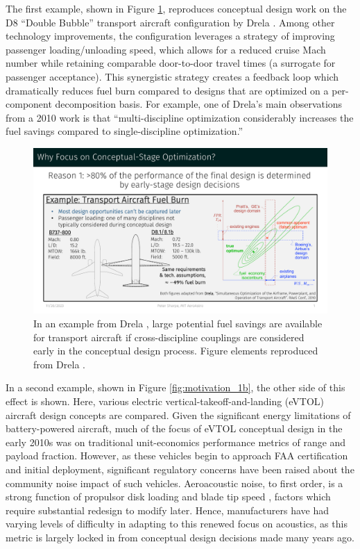 The first example, shown in Figure \ref{fig:motivation_1a}, reproduces conceptual design work on the D8 ``Double Bubble'' transport aircraft configuration by Drela \cite{drela_development_2011, drela_simultaneous_2010}. Among other technology improvements, the configuration leverages a strategy of improving passenger loading/unloading speed, which allows for a reduced cruise Mach number while retaining comparable door-to-door travel times (a surrogate for passenger acceptance). This synergistic strategy creates a feedback loop which dramatically reduces fuel burn compared to designs that are optimized on a per-component decomposition basis. For example, one of Drela's main observations from a 2010 work \cite{drela_simultaneous_2010} is that ``multi-discipline optimization considerably increases the fuel savings compared to single-discipline optimization.''

\begin{figure}[H]
    \centering
    \includegraphics[page=1,trim=1cm 1.3cm 1cm 5cm, clip, width=\textwidth]{../figures/motivation_for_conceptual_MDO_focus.pdf}
    \caption{In an example from Drela \cite{drela_development_2011}, large potential fuel savings are available for transport aircraft if cross-discipline couplings are considered early in the conceptual design process. Figure elements reproduced from Drela \cite{drela_simultaneous_2010}.}
    \label{fig:motivation_1a}
\end{figure}

In a second example, shown in Figure \ref{fig:motivation_1b}, the other side of this effect is shown. Here, various electric vertical-takeoff-and-landing (eVTOL) aircraft design concepts are compared. Given the significant energy limitations of battery-powered aircraft, much of the focus of eVTOL conceptual design in the early 2010s was on traditional unit-economics performance metrics of range and payload fraction. However, as these vehicles begin to approach FAA certification and initial deployment, significant regulatory concerns have been raised about the community noise impact of such vehicles. Aeroacoustic noise, to first order, is a strong function of propulsor disk loading and blade tip speed \cite{marte_review_1970}, factors which require substantial redesign to modify later. Hence, manufacturers have had varying levels of difficulty in adapting to this renewed focus on acoustics, as this metric is largely locked in from conceptual design decisions made many years ago.

